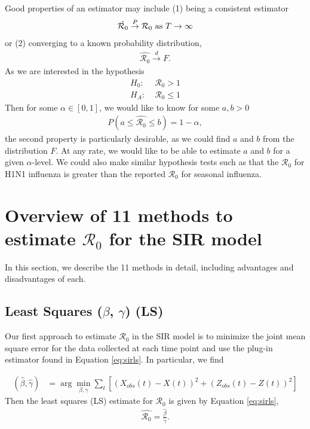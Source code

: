 \message{ !name(draft_v13.tex)}\documentclass[12pt]{article}
\newcommand{\wxxsir}{11 }
\newcommand{\rr}{\ensuremath{\mathcal{R}_0}}
\begin{document}
Good properties of an estimator may include (1) being a consistent estimator
\begin{align*}
  \hat{\rr} \overset{P}{\to} \rr \textnormal{ as } T\to \infty
\end{align*}
or (2) converging to a known probability distribution,
\begin{align*}
\hat{\rr} \overset{d}{\to} F.  
\end{align*}
As we are interested in the hypothesis
\begin{align*}
  H_0:\;& \rr > 1 \\
  H_A:\;& \rr \le 1
\end{align*}
Then for some $\alpha \in [0,1]$, we would like to know for some $a, b >0$
\begin{align*}
P(a \le \hat{\rr} \le b) = 1 - \alpha,  
\end{align*}
the second property is particularly desirable, as we could find $a$ and $b$ from the distribution $F$.  At any rate, we would like to be able to estimate $a$ and $b$ for a given $\alpha$-level.  We could also make similar hypothesis tests such as that the $\rr$ for H1N1 influenza is greater than the reported $\rr$ for seasonal influenza.

\section{Overview of \wxxsir methods to estimate $\rr$ for the SIR model}
\label{sec:methods} 

In this section, we describe the \wxxsir methods in detail, including advantages and disadvantages of each.

\subsection{Least Squares ($\beta$, $\gamma$) (LS)}\label{least-squares-beta-gamma}
Our first approach to estimate $\rr$ in the SIR model is to minimize the joint mean square error for the data collected at each time point and use the plug-in estimator found in Equation \ref{eq:sirls}.  In particular, we find

\begin{align*}
(\hat{\beta}, \hat{\gamma} )&=\arg \min_{\beta, \gamma} \sum_{t} \left [ \left (X_{obs}(t) - X(t)\right )^2 + \left ( Z_{obs}(t) - Z(t) \right )^2 \right ]
\end{align*}
Then the least squares (LS) estimate for $\rr$ is given by Equation \ref{eq:sirls},
\begin{align}\label{eq:sirls}
  \hat{\rr}= \frac{\hat{\beta}}{\hat{\gamma}}.
\end{align}
\end{document}

